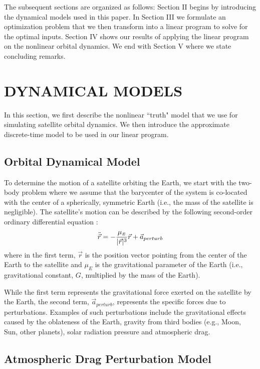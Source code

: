 \documentclass[letterpaper, 10 pt, conference]{ieeeconf}  %
\begin{document}
The subsequent sections are organized as follows: Section II begins by introducing the dynamical models used in this paper. In Section III we formulate an optimization problem that we then transform into a linear program to solve for the optimal inputs. Section IV shows our results of applying the linear program on the nonlinear orbital dynamics. We end with Section V where we state concluding remarks.

\section{DYNAMICAL MODELS}

In this section, we first describe the nonlinear ``truth" model that we use for simulating satellite orbital dynamics. We then introduce the approximate discrete-time model to be used in our linear program.

\subsection{Orbital Dynamical Model}

To determine the motion of a satellite orbiting the Earth, we start with the two-body problem where we assume that the barycenter of the system is co-located with the center of a spherically, symmetric Earth (i.e., the mass of the satellite is negligible). The satellite's motion can be described by the following second-order ordinary differential equation \cite{BMW}:
\begin{equation}
 \ddot{\vec{r}} = -\frac{\mu_{\scriptscriptstyle E}}{|\vec{r}|^3}\vec{r} + \vec{a}_{perturb} \\
\end{equation}
where in the first term, $\vec{r}$ is the position vector pointing from the center of the Earth to the satellite and $\mu_{\scriptscriptstyle E}$ is the gravitational parameter of the Earth (i.e., gravitational constant, $G$, multiplied by the mass of the Earth).

While the first term represents the gravitational force exerted on the satellite by the Earth, the second term, $\vec{a}_{perturb}$, represents the specific forces due to perturbations. Examples of such perturbations include the gravitational effects caused by the oblateness of the Earth, gravity from third bodies (e.g., Moon, Sun, other planets), solar radiation pressure and atmospheric drag. 

\subsection{Atmospheric Drag Perturbation Model}
\end{document}

